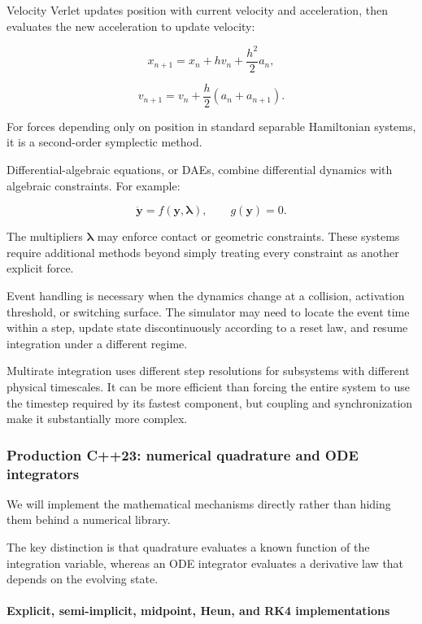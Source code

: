 Velocity Verlet updates position with current velocity and acceleration, then evaluates the new acceleration to update velocity:

\[
x_{n+1}=x_n+hv_n+\frac{h^2}{2}a_n,
\]

\[
v_{n+1}=v_n+\frac h2(a_n+a_{n+1}).
\]

For forces depending only on position in standard separable Hamiltonian systems, it is a second-order symplectic method.

Differential-algebraic equations, or DAEs, combine differential dynamics with algebraic constraints. For example:

\[
\dot{\mathbf y}=f(\mathbf y,\boldsymbol\lambda), \qquad g(\mathbf y)=0.
\]

The multipliers \(\boldsymbol\lambda\) may enforce contact or geometric constraints. These systems require additional methods beyond simply treating every constraint as another explicit force.

Event handling is necessary when the dynamics change at a collision, activation threshold, or switching surface. The simulator may need to locate the event time within a step, update state discontinuously according to a reset law, and resume integration under a different regime.

Multirate integration uses different step resolutions for subsystems with different physical timescales. It can be more efficient than forcing the entire system to use the timestep required by its fastest component, but coupling and synchronization make it substantially more complex.

\subsubsection{Production C++23: numerical quadrature and ODE integrators}\label{02-foundations-ii-ch025-production-c23-numerical-quadrature-and-ode-integrators}

\hypertarget{02-foundations-ii-ch025-production-c23-numerical-quadrature-and-ode-integrators}{}

We will implement the mathematical mechanisms directly rather than hiding them behind a numerical library.

The key distinction is that quadrature evaluates a known function of the integration variable, whereas an ODE integrator evaluates a derivative law that depends on the evolving state.

\paragraph{Explicit, semi-implicit, midpoint, Heun, and RK4 implementations}\label{02-foundations-ii-ch025-explicit-semi-implicit-midpoint-heun-and-rk4-implementations}

